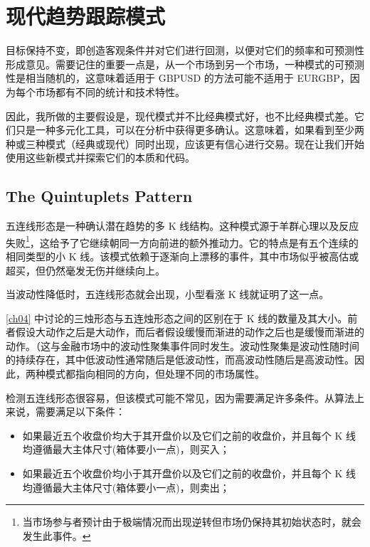 \chapter{现代趋势跟踪模式}
目标保持不变，即创造客观条件并对它们进行回测，以便对它们的频率和可预测性形成意见。需要记住的重要一点是，从一个市场到另一个市场，一种模式的可预测性是相当随机的，这意味着适用于 GBPUSD 的方法可能不适用于 EURGBP，因为每个市场都有不同的统计和技术特性。

因此，我所做的主要假设是，现代模式并不比经典模式好，也不比经典模式差。它们只是一种多元化工具，可以在分析中获得更多确认。这意味着，如果看到至少两种或三种模式（经典或现代）同时出现，应该更有信心进行交易。现在让我们开始使用这些新模式并探索它们的本质和代码。
\section{The Quintuplets Pattern}
五连线形态是一种确认潜在趋势的多 K 线结构。这种模式源于羊群心理以及反应失败\footnote{当市场参与者预计由于极端情况而出现逆转但市场仍保持其初始状态时，就会发生此事件。}，这给予了它继续朝同一方向前进的额外推动力。它的特点是有五个连续的相同类型的小 K 线。该模式依赖于逐渐向上漂移的事件，其中市场似乎被高估或超买，但仍然毫发无伤并继续向上。


当波动性降低时，五连线形态就会出现，小型看涨 K 线就证明了这一点。

\autoref{ch04} 中讨论的三烛形态与五连烛形态之间的区别在于 K 线的数量及其大小。前者假设大动作之后是大动作，而后者假设缓慢而渐进的动作之后也是缓慢而渐进的动作。（这与金融市场中的波动性聚集事件同时发生。波动性聚集是波动性随时间的持续存在，其中低波动性通常随后是低波动性，而高波动性随后是高波动性。因此，两种模式都指向相同的方向，但处理不同的市场属性。

检测五连线形态很容易，但该模式可能不常见，因为需要满足许多条件。从算法上来说，需要满足以下条件：
\begin{itemize}
    \item 如果最近五个收盘价均大于其开盘价以及它们之前的收盘价，并且每个 K 线均遵循最大主体尺寸(箱体要小一点)，则买入；
    \item 如果最近五个收盘价均小于其开盘价以及它们之前的收盘价，并且每个 K 线均遵循最大主体尺寸(箱体要小一点)，则卖出；
\end{itemize}